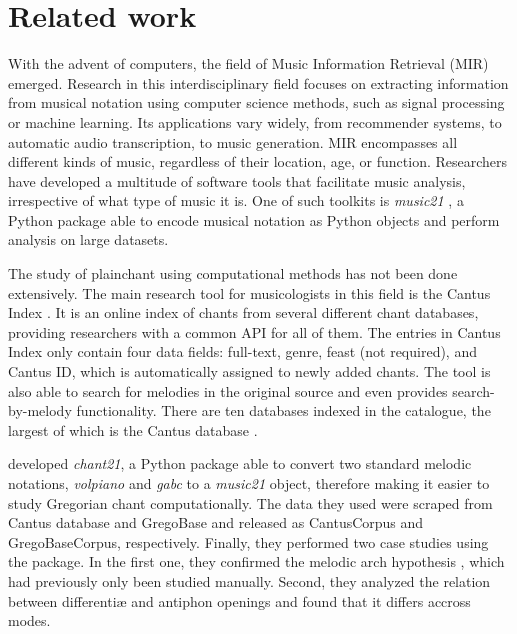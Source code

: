 \chapter{Related work}

With the advent of computers, the field of Music Information Retrieval (MIR) emerged. Research in this interdisciplinary field focuses on extracting
information from musical notation using computer science methods, such as signal processing or machine learning. Its applications
vary widely, from recommender systems, to automatic audio transcription, to music generation. MIR encompasses all different kinds of music,
regardless of their location, age, or function. Researchers have developed a multitude of software tools that facilitate music analysis,
irrespective of what type of music it is. One of such toolkits is \emph{music21} \citep{music21}, a Python package able to encode musical notation
as Python objects and perform analysis on large datasets.

The study of plainchant using computational methods has not been done extensively. The main research tool for musicologists in this field
is the Cantus Index \citep{cantus_index}. It is an online index of chants from several different chant databases, providing researchers with 
a common API for all of them. The entries in Cantus Index only contain four data fields: full-text, genre, feast (not required), and Cantus ID,
which is automatically assigned to newly added chants. The tool is also able to search for melodies in the original source and even provides 
search-by-melody functionality. There are ten databases indexed in the catalogue, the largest of which is the Cantus database \citep{cantus_db}.

\cite{chant21} developed \emph{chant21}, a Python package able to convert two standard melodic notations, \emph{volpiano} and \emph{gabc} to
a \emph{music21} object, therefore making it easier to study Gregorian chant computationally. The data they used were 
scraped from Cantus database \citep{cantus_db} and GregoBase \citep{gregobase} and released as CantusCorpus and GregoBaseCorpus, respectively.
Finally, they performed two case studies using the package. In the first one, they confirmed the melodic arch hypothesis \citep{melodic_arch}, 
which had previously only been studied manually. Second, they analyzed the relation between differentiæ and antiphon openings \citep{differentiae}
and found that it differs accross modes.

